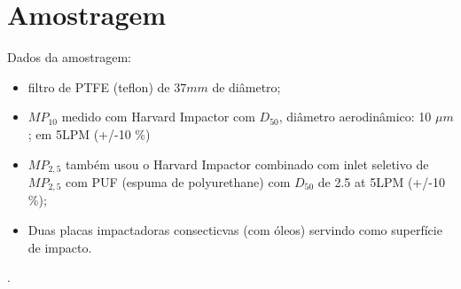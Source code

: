 \section{Amostragem}

Dados da amostragem:%

\begin{itemize}
  \item filtro de PTFE (teflon) de $37mm$ de diâmetro;
  \item $MP_{10}$ medido com Harvard Impactor com $D_50$, diâmetro 
        aerodinâmico: 10 $\mu m$;
em 5LPM (+/-10 \%)%

  \item $MP_{2,5}$ também usou o Harvard Impactor combinado com inlet 
         seletivo de $MP_{2,5}$ com PUF (espuma de polyurethane) com $D_50$ 
          de 2.5 at 5LPM (+/-10 \%);
  \item Duas placas impactadoras consecticvas (com óleos) servindo como 
        superfície de impacto.
        

\end{itemize}




.




